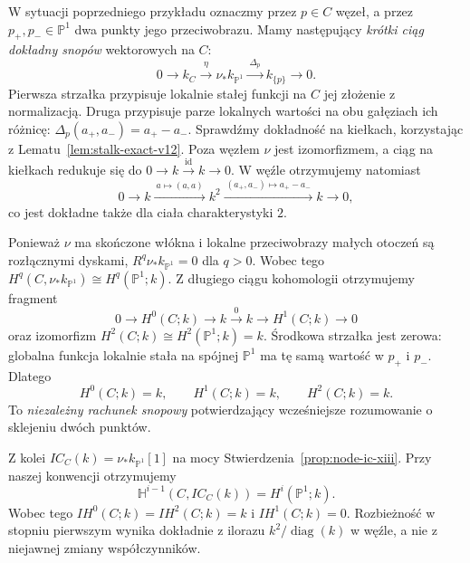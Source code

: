 \begin{przyklad}
\label{prz:node-normalization-exact-sequence}
W sytuacji poprzedniego przykładu oznaczmy
przez $p\in C$ węzeł, a przez
$p_+,p_-\in\mathbb P^1$ dwa punkty jego przeciwobrazu.
Mamy następujący \emph{krótki ciąg dokładny snopów}
wektorowych na $C$:
\[
 0\longrightarrow k_C
 \xrightarrow{\ \eta\ }\nu_*k_{\mathbb P^1}
 \xrightarrow{\ \Delta_p\ }k_{\{p\}}
 \longrightarrow0.
\]
Pierwsza strzałka przypisuje lokalnie stałej funkcji
na $C$ jej złożenie z normalizacją.
Druga przypisuje parze lokalnych wartości na obu
gałęziach ich różnicę:
$\Delta_p(a_+,a_-)=a_+-a_-$.
Sprawdźmy dokładność na kiełkach, korzystając
z Lematu~\ref{lem:stalk-exact-v12}.
Poza węzłem $\nu$ jest izomorfizmem, a ciąg na
kiełkach redukuje się do
$0\to k\xrightarrow{\mathrm{id}}k\to0$.
W węźle otrzymujemy natomiast
\[
 0\longrightarrow k
 \xrightarrow{\ a\mapsto(a,a)\ }k^2
 \xrightarrow{\ (a_+,a_-)\mapsto a_+-a_-\ }k
 \longrightarrow0,
\]
co jest dokładne także dla ciała charakterystyki $2$.

Ponieważ $\nu$ ma skończone włókna i lokalne
przeciwobrazy małych otoczeń są rozłącznymi dyskami,
$R^q\nu_*k_{\mathbb P^1}=0$ dla $q>0$.
Wobec tego
$H^q(C,\nu_*k_{\mathbb P^1})
\cong H^q(\mathbb P^1;k)$.
Z długiego ciągu kohomologii otrzymujemy fragment
\[
 0\to H^0(C;k)\to k
 \xrightarrow{\ 0\ }k
 \to H^1(C;k)\to0
\]
oraz izomorfizm
$H^2(C;k)\cong H^2(\mathbb P^1;k)=k$.
Środkowa strzałka jest zerowa: globalna funkcja
lokalnie stała na spójnej $\mathbb P^1$ ma tę samą
wartość w $p_+$ i $p_-$.
Dlatego
\[
 H^0(C;k)=k,\qquad
 H^1(C;k)=k,\qquad
 H^2(C;k)=k.
\]
To \emph{niezależny rachunek snopowy} potwierdzający
wcześniejsze rozumowanie o sklejeniu dwóch punktów.

Z kolei $IC_C(k)=\nu_*k_{\mathbb P^1}[1]$
na mocy Stwierdzenia~\ref{prop:node-ic-xiii}.
Przy naszej konwencji otrzymujemy
\[
\mathbb H^{i-1}(C,IC_C(k))=H^i(\mathbb P^1;k).
\]
Wobec tego
$IH^0(C;k)=IH^2(C;k)=k$ i
$IH^1(C;k)=0$.
Rozbieżność w stopniu pierwszym wynika dokładnie
z ilorazu $k^2/\operatorname{diag}(k)$
w węźle, a nie z niejawnej zmiany współczynników.
\end{przyklad}

